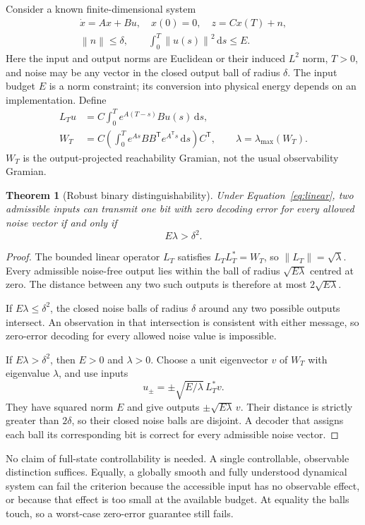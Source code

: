 \documentclass[11pt,a4paper]{article}
\newtheorem{theorem}{Theorem}[section]
\theoremstyle{definition}
\theoremstyle{remark}
\newcommand{\norm}[1]{\left\lVert#1\right\rVert}
\begin{document}
Consider a known finite-dimensional system
\begin{equation}\label{eq:linear}
 \begin{gathered}
 \dot x=Ax+Bu,\quad x(0)=0,\quad z=Cx(T)+n,\\
 \norm{n}\leq\delta,\qquad \int_0^T\norm{u(s)}^2\,\mathrm ds\leq E.
 \end{gathered}
\end{equation}
Here the input and output norms are Euclidean or their induced $L^2$ norm, $T>0$, and noise may be any vector in the closed output ball of radius $\delta$. The input budget $E$ is a norm constraint; its conversion into physical energy depends on an implementation. Define
\begin{align}
 L_Tu&=C\int_0^T e^{A(T-s)}Bu(s)\,\mathrm ds,\label{eq:LT}\\
 W_T&=C\left(\int_0^T e^{As}BB^{\mathsf T}e^{A^{\mathsf T}s}\,\mathrm ds\right)C^{\mathsf T},
 \qquad \lambda=\lambda_{\max}(W_T).\label{eq:gramian}
\end{align}
$W_T$ is the output-projected reachability Gramian, not the usual observability Gramian.

\begin{theorem}[Robust binary distinguishability]\label{thm:bit}
Under Equation~\eqref{eq:linear}, two admissible inputs can transmit one bit with zero decoding error for every allowed noise vector if and only if
\begin{equation}\label{eq:bitcriterion}
 E\lambda>\delta^2.
\end{equation}
\end{theorem}
\begin{proof}
The bounded linear operator $L_T$ satisfies $L_TL_T^*=W_T$, so $\norm{L_T}=\sqrt{\lambda}$. Every admissible noise-free output lies within the ball of radius $\sqrt{E\lambda}$ centred at zero. The distance between any two such outputs is therefore at most $2\sqrt{E\lambda}$.

If $E\lambda\leq\delta^2$, the closed noise balls of radius $\delta$ around any two possible outputs intersect. An observation in that intersection is consistent with either message, so zero-error decoding for every allowed noise value is impossible.

If $E\lambda>\delta^2$, then $E>0$ and $\lambda>0$. Choose a unit eigenvector $v$ of $W_T$ with eigenvalue $\lambda$, and use inputs
\[
 u_\pm=\pm\sqrt{E/\lambda}\,L_T^*v.
\]
They have squared norm $E$ and give outputs $\pm\sqrt{E\lambda}\,v$. Their distance is strictly greater than $2\delta$, so their closed noise balls are disjoint. A decoder that assigns each ball its corresponding bit is correct for every admissible noise vector.
\end{proof}
No claim of full-state controllability is needed. A single controllable, observable distinction suffices. Equally, a globally smooth and fully understood dynamical system can fail the criterion because the accessible input has no observable effect, or because that effect is too small at the available budget. At equality the balls touch, so a worst-case zero-error guarantee still fails.
\end{document}
